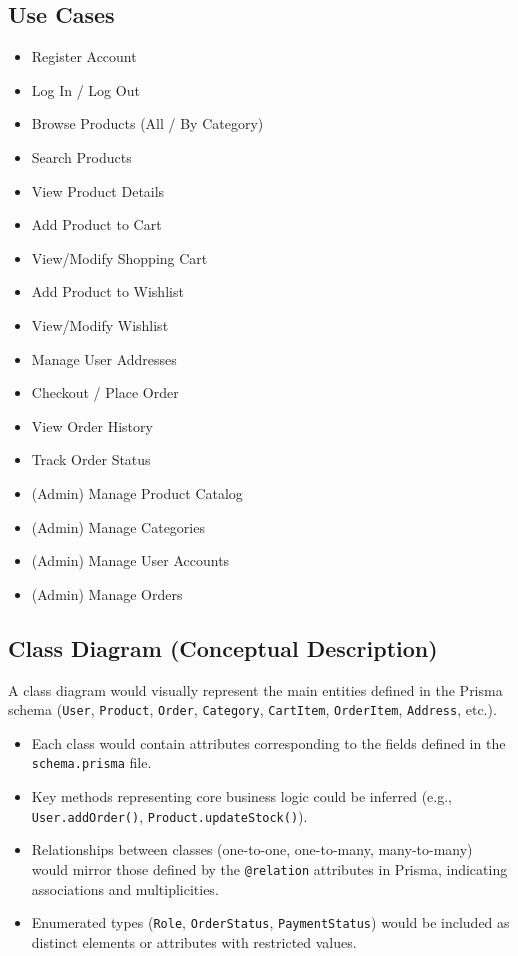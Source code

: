 \documentclass{article}
\begin{document}
\subsection{Use Cases}
\begin{itemize}[label=\textbullet]
    \item Register Account
    \item Log In / Log Out
    \item Browse Products (All / By Category)
    \item Search Products
    \item View Product Details
    \item Add Product to Cart
    \item View/Modify Shopping Cart
    \item Add Product to Wishlist
    \item View/Modify Wishlist
    \item Manage User Addresses
    \item Checkout / Place Order
    \item View Order History
    \item Track Order Status
    \item (Admin) Manage Product Catalog
    \item (Admin) Manage Categories
    \item (Admin) Manage User Accounts
    \item (Admin) Manage Orders
\end{itemize}

\subsection{Class Diagram (Conceptual Description)}
A class diagram would visually represent the main entities defined in the Prisma schema (\texttt{User}, \texttt{Product}, \texttt{Order}, \texttt{Category}, \texttt{CartItem}, \texttt{OrderItem}, \texttt{Address}, etc.).
\begin{itemize}[label=\textbullet]
    \item Each class would contain attributes corresponding to the fields defined in the \texttt{schema.prisma} file.
    \item Key methods representing core business logic could be inferred (e.g., \texttt{User.addOrder()}, \texttt{Product.updateStock()}).
    \item Relationships between classes (one-to-one, one-to-many, many-to-many) would mirror those defined by the \texttt{@relation} attributes in Prisma, indicating associations and multiplicities.
    \item Enumerated types (\texttt{Role}, \texttt{OrderStatus}, \texttt{PaymentStatus}) would be included as distinct elements or attributes with restricted values.
\end{itemize}
\end{document}
